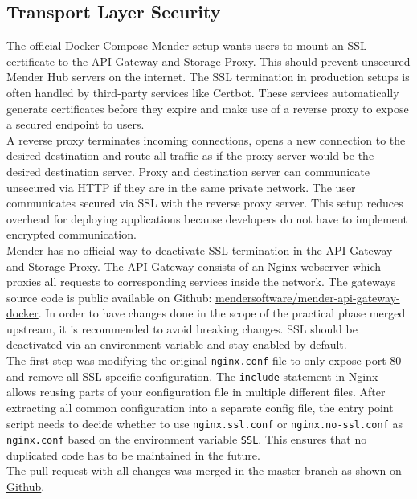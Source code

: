 \subsection{Transport Layer Security}
The official Docker-Compose Mender setup wants users to mount an SSL certificate to the API-Gateway and Storage-Proxy. This should prevent unsecured Mender Hub servers on the internet. The SSL termination in production setups is often handled by third-party services like Certbot. These services automatically generate certificates before they expire and make use of a reverse proxy to expose a secured endpoint to users.\\
A reverse proxy terminates incoming connections, opens a new connection to the desired destination and route all traffic as if the proxy server would be the desired destination server. Proxy and destination server can communicate unsecured via HTTP if they are in the same private network. The user communicates secured via SSL with the reverse proxy server. This setup reduces overhead for deploying applications because developers do not have to implement encrypted communication.\\
Mender has no official way to deactivate SSL termination in the API-Gateway and Storage-Proxy. The API-Gateway consists of an Nginx webserver which proxies all requests to corresponding services inside the network. The gateways source code is public available on Github: \href{https://github.com/mendersoftware/mender-api-gateway-docker}{mendersoftware/mender-api-gateway-docker}. In order to have changes done in the scope of the practical phase merged upstream, it is recommended to avoid breaking changes. SSL should be deactivated via an environment variable and stay enabled by default.\\
The first step was modifying the original \verb|nginx.conf| file to only expose port 80 and remove all SSL specific configuration. The \verb|include| statement in Nginx allows reusing parts of your configuration file in multiple different files. After extracting all common configuration into a separate config file, the entry point script needs to decide whether to use \verb|nginx.ssl.conf| or \verb|nginx.no-ssl.conf| as \verb|nginx.conf| based on the environment variable \verb|SSL|. This ensures that no duplicated code has to be maintained in the future.\\
The pull request with all changes was merged in the master branch as shown on \href{https://github.com/mendersoftware/mender-api-gateway-docker/pull/109}{Github}.\\

